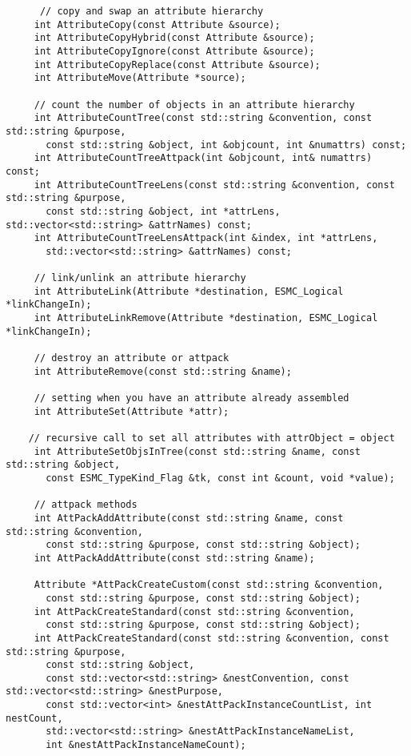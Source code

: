 \begin{verbatim}
      // copy and swap an attribute hierarchy
     int AttributeCopy(const Attribute &source);
     int AttributeCopyHybrid(const Attribute &source);
     int AttributeCopyIgnore(const Attribute &source);
     int AttributeCopyReplace(const Attribute &source);
     int AttributeMove(Attribute *source);
 
     // count the number of objects in an attribute hierarchy
     int AttributeCountTree(const std::string &convention, const std::string &purpose,
       const std::string &object, int &objcount, int &numattrs) const;
     int AttributeCountTreeAttpack(int &objcount, int& numattrs) const;
     int AttributeCountTreeLens(const std::string &convention, const std::string &purpose,
       const std::string &object, int *attrLens, std::vector<std::string> &attrNames) const;
     int AttributeCountTreeLensAttpack(int &index, int *attrLens,
       std::vector<std::string> &attrNames) const;
 
     // link/unlink an attribute hierarchy
     int AttributeLink(Attribute *destination, ESMC_Logical *linkChangeIn);
     int AttributeLinkRemove(Attribute *destination, ESMC_Logical *linkChangeIn);
 
     // destroy an attribute or attpack
     int AttributeRemove(const std::string &name);
 
     // setting when you have an attribute already assembled
     int AttributeSet(Attribute *attr);
 
    // recursive call to set all attributes with attrObject = object
     int AttributeSetObjsInTree(const std::string &name, const std::string &object,
       const ESMC_TypeKind_Flag &tk, const int &count, void *value);
 
     // attpack methods
     int AttPackAddAttribute(const std::string &name, const std::string &convention,
       const std::string &purpose, const std::string &object);
     int AttPackAddAttribute(const std::string &name);
 
     Attribute *AttPackCreateCustom(const std::string &convention,
       const std::string &purpose, const std::string &object);
     int AttPackCreateStandard(const std::string &convention,
       const std::string &purpose, const std::string &object);
     int AttPackCreateStandard(const std::string &convention, const std::string &purpose,
       const std::string &object,
       const std::vector<std::string> &nestConvention, const std::vector<std::string> &nestPurpose,
       const std::vector<int> &nestAttPackInstanceCountList, int nestCount,
       std::vector<std::string> &nestAttPackInstanceNameList,
       int &nestAttPackInstanceNameCount);
 

\end{verbatim}
